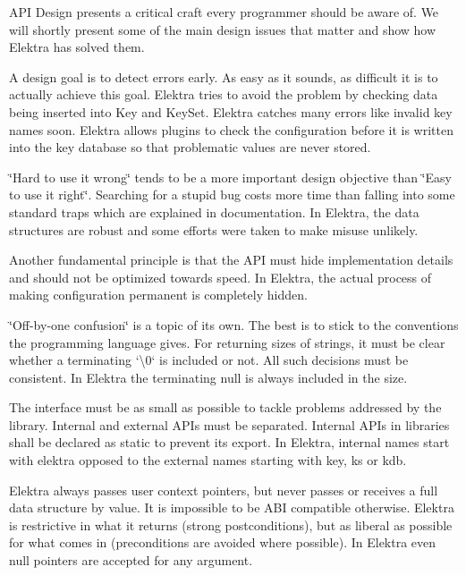 A\+PI Design presents a critical craft every programmer should be aware of. We will shortly present some of the main design issues that matter and show how Elektra has solved them.

A design goal is to detect errors early. As easy as it sounds, as difficult it is to actually achieve this goal. Elektra tries to avoid the problem by checking data being inserted into {\ttfamily Key} and {\ttfamily Key\+Set}. Elektra catches many errors like invalid key names soon. Elektra allows plugins to check the configuration before it is written into the key database so that problematic values are never stored.

\char`\"{}\+Hard to use it wrong\char`\"{} tends to be a more important design objective than \char`\"{}\+Easy to use it right\char`\"{}. Searching for a stupid bug costs more time than falling into some standard traps which are explained in documentation. In Elektra, the data structures are robust and some efforts were taken to make misuse unlikely.

Another fundamental principle is that the A\+PI must hide implementation details and should not be optimized towards speed. In Elektra, the actual process of making configuration permanent is completely hidden.

\char`\"{}\+Off-\/by-\/one confusion\char`\"{} is a topic of its own. The best is to stick to the conventions the programming language gives. For returning sizes of strings, it must be clear whether a terminating `\textquotesingle{}\textbackslash{}0\textquotesingle{}` is included or not. All such decisions must be consistent. In Elektra the terminating null is always included in the size.

The interface must be as small as possible to tackle problems addressed by the library. Internal and external A\+P\+Is must be separated. Internal A\+P\+Is in libraries shall be declared as {\ttfamily static} to prevent its export. In Elektra, internal names start with {\ttfamily elektra} opposed to the external names starting with {\ttfamily key}, {\ttfamily ks} or {\ttfamily kdb}.

Elektra always passes user context pointers, but never passes or receives a full data structure by value. It is impossible to be A\+BI compatible otherwise. Elektra is restrictive in what it returns (strong postconditions), but as liberal as possible for what comes in (preconditions are avoided where possible). In Elektra even null pointers are accepted for any argument.

